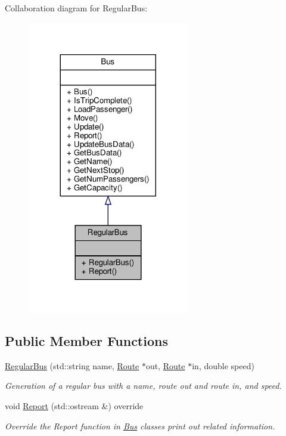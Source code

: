 Collaboration diagram for Regular\+Bus\+:\nopagebreak
\begin{figure}[H]
\begin{center}
\leavevmode
\includegraphics[width=200pt]{classRegularBus__coll__graph}
\end{center}
\end{figure}
\subsection*{Public Member Functions}
\begin{DoxyCompactItemize}
\item 
\hyperlink{classRegularBus_abbd9757718de0614f2988e89ad955917}{Regular\+Bus} (std\+::string name, \hyperlink{classRoute}{Route} $\ast$out, \hyperlink{classRoute}{Route} $\ast$in, double speed)
\begin{DoxyCompactList}\small\item\em Generation of a regular bus with a name, route out and route in, and speed. \end{DoxyCompactList}\item 
void \hyperlink{classRegularBus_a1c8e52afd8ba3cc1f6bf251e9cb10e5f}{Report} (std\+::ostream \&) override
\begin{DoxyCompactList}\small\item\em Override the Report function in \hyperlink{classBus}{Bus} classes print out related information. \end{DoxyCompactList}\end{DoxyCompactItemize}



